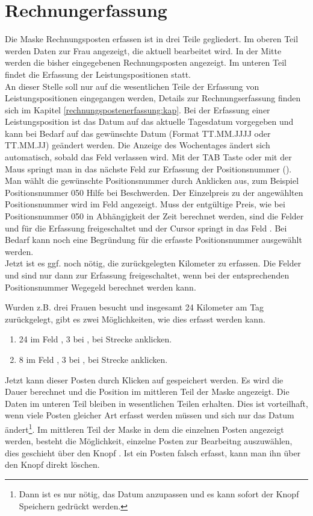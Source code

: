 \section{Rechnungerfassung}\label{kurz:rechnungserfassung:kap}
Die Maske Rechnungsposten erfassen ist in drei Teile gegliedert. Im oberen Teil
werden Daten zur Frau angezeigt, die aktuell bearbeitet wird. In der Mitte
werden die bisher eingegebenen Rechnungsposten angezeigt. Im unteren Teil
findet die Erfassung der Leistungspositionen statt.\\
An dieser Stelle soll nur auf die  wesentlichen Teile der Erfassung von
Leistungspositionen eingegangen werden, Details zur Rechnungserfassung
finden sich im Kapitel \vref{rechnungspostenerfassung:kap}.
Bei der Erfassung einer Leistungsposition ist das Datum auf das aktuelle
Tagesdatum vorgegeben und kann bei Bedarf auf das gewünschte Datum 
(Format TT.MM.JJJJ oder TT.MM.JJ) geändert werden. Die Anzeige des Wochentages
ändert sich automatisch, sobald das Feld  verlassen wird.
Mit der TAB Taste oder mit der Maus springt man in das nächste Feld 
zur Erfassung der Positionsnummer ().
Man wählt die gewünschte Positionsnummer durch Anklicken aus, zum Beispiel
Positionsnummer 050 Hilfe bei Beschwerden. Der Einzelpreis zu der 
angewählten Positionsnummer wird im Feld  angezeigt.
Muss der entgültige Preis, wie bei Positionsnummer 050 in Abhängigkeit 
der Zeit berechnet werden,
sind die Felder  und 
für die Erfassung freigeschaltet und der Cursor springt in das Feld
.
Bei Bedarf kann noch eine Begründung für die erfasste Positionsnummer
ausgewählt werden.\\
Jetzt ist es ggf. noch nötig, die zurückgelegten Kilometer zu erfassen.
Die Felder  und  sind nur
dann zur Erfassung freigeschaltet, wenn bei der entsprechenden Positionsnummer
Wegegeld berechnet werden kann.

Wurden z.B. drei Frauen besucht und
insgesamt 24 Kilometer am Tag zurückgelegt, gibt es zwei Möglichkeiten, 
wie dies erfasst werden kann.
\begin {enumerate}
\item 24 im Feld , 3 bei , bei Strecke  anklicken.
\item 8 im Feld , 3 bei , bei Strecke 
anklicken.
\end {enumerate}
Jetzt kann dieser Posten durch Klicken auf  gespeichert werden. Es wird die Dauer berechnet und die Position im mittleren Teil der Maske 
angezeigt. Die Daten im unteren Teil bleiben in wesentlichen Teilen erhalten.
Dies ist vorteilhaft, wenn viele Posten gleicher Art erfasst werden müssen
und sich nur das Datum ändert\footnote{Dann ist es nur nötig, das Datum anzupassen und es kann sofort der Knopf Speichern gedrückt werden.}.
Im mittleren Teil der Maske in dem die einzelnen Posten angezeigt werden,
besteht die Möglichkeit, einzelne Posten zur Bearbeitng auszuwählen, dies
geschieht über den Knopf . Ist ein Posten falsch erfasst, kann man
ihn über den Knopf  direkt löschen.

